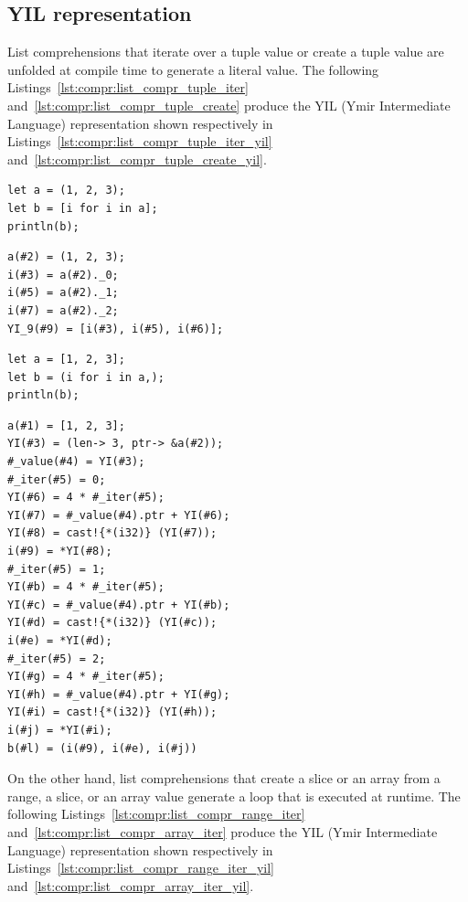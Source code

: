 \subsection{YIL representation}

List comprehensions that iterate over a tuple value or create a tuple value are
unfolded at compile time to generate a literal value. The following
Listings~\ref{lst:compr:list_compr_tuple_iter} and~\ref{lst:compr:list_compr_tuple_create}
produce the YIL (Ymir Intermediate Language) representation shown respectively
in Listings~\ref{lst:compr:list_compr_tuple_iter_yil}
and~\ref{lst:compr:list_compr_tuple_create_yil}.

\begin{lstlisting}[style=coloredverbatim, label=lst:compr:list_compr_tuple_iter, caption=List comprehension iterating over a tuple]
let a = (1, 2, 3);
let b = [i for i in a];
println(b);
\end{lstlisting}

\begin{lstlisting}[style=lyilVerb, label=lst:compr:list_compr_tuple_iter_yil, caption=YIL representation of Listing~\ref{lst:compr:list_compr_tuple_iter}]
a(#2) = (1, 2, 3);
i(#3) = a(#2)._0;
i(#5) = a(#2)._1;
i(#7) = a(#2)._2;
YI_9(#9) = [i(#3), i(#5), i(#6)];
\end{lstlisting}

\begin{lstlisting}[style=coloredverbatim, label=lst:compr:list_compr_tuple_create, caption=List comprehension iterating over a tuple]
let a = [1, 2, 3];
let b = (i for i in a,);
println(b);
\end{lstlisting}

\begin{lstlisting}[style=lyilVerb, label=lst:compr:list_compr_tuple_create_yil, caption=YIL representation of Listing~\ref{lst:compr:list_compr_tuple_create}]
a(#1) = [1, 2, 3];
YI(#3) = (len-> 3, ptr-> &a(#2));
#_value(#4) = YI(#3);
#_iter(#5) = 0;
YI(#6) = 4 * #_iter(#5);
YI(#7) = #_value(#4).ptr + YI(#6);
YI(#8) = cast!{*(i32)} (YI(#7));
i(#9) = *YI(#8);
#_iter(#5) = 1;
YI(#b) = 4 * #_iter(#5);
YI(#c) = #_value(#4).ptr + YI(#b);
YI(#d) = cast!{*(i32)} (YI(#c));
i(#e) = *YI(#d);
#_iter(#5) = 2;
YI(#g) = 4 * #_iter(#5);
YI(#h) = #_value(#4).ptr + YI(#g);
YI(#i) = cast!{*(i32)} (YI(#h));
i(#j) = *YI(#i);
b(#l) = (i(#9), i(#e), i(#j))
\end{lstlisting}

On the other hand, list comprehensions that create a slice or an array from a
range, a slice, or an array value generate a loop that is executed at runtime.
The following Listings~\ref{lst:compr:list_compr_range_iter}
and~\ref{lst:compr:list_compr_array_iter} produce the YIL (Ymir Intermediate Language)
representation shown respectively in
Listings~\ref{lst:compr:list_compr_range_iter_yil}
and~\ref{lst:compr:list_compr_array_iter_yil}.

